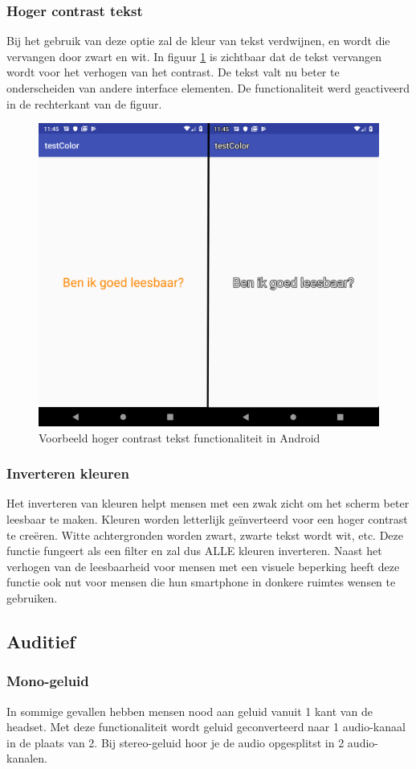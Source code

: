 \subsubsection{Hoger contrast tekst}
Bij het gebruik van deze optie zal de kleur van tekst verdwijnen, en wordt die vervangen door zwart en wit.
In figuur \ref{fig:contrastInAndroid} is zichtbaar dat de tekst vervangen wordt voor het verhogen van het contrast. De tekst valt nu beter te onderscheiden van andere interface elementen. De functionaliteit werd geactiveerd in de rechterkant van de figuur.
\begin{figure}[h]
    \centering
    \includegraphics[width=0.6\linewidth]{img/contrastInAndroid}
    \caption{Voorbeeld hoger contrast tekst functionaliteit in Android}
    \label{fig:contrastInAndroid}
\end{figure}
\newpage
\subsubsection{Inverteren kleuren}

Het inverteren van kleuren helpt mensen met een zwak zicht om het scherm beter leesbaar te maken. Kleuren worden letterlijk geïnverteerd voor een hoger contrast te creëren. Witte achtergronden worden zwart, zwarte tekst wordt wit, etc. Deze functie fungeert als een filter en zal dus ALLE kleuren inverteren.
Naast het verhogen van de leesbaarheid voor mensen met een visuele beperking heeft deze functie ook nut voor mensen die hun smartphone in donkere ruimtes wensen te gebruiken.

\subsection{Auditief}
\subsubsection{Mono-geluid}
In sommige gevallen hebben mensen nood aan geluid vanuit 1 kant van de headset. Met deze functionaliteit wordt geluid geconverteerd naar 1 audio-kanaal in de plaats van 2. Bij stereo-geluid hoor je de audio opgesplitst in 2 audio-kanalen.

